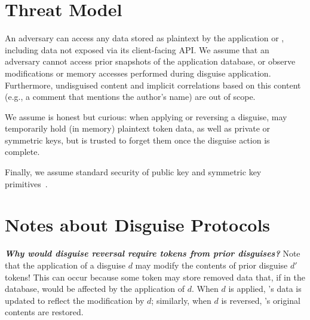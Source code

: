 
\section{Threat Model}
An adversary can access any data stored as plaintext by the application or \sys, including data not
exposed via its client-facing API. We assume that an adversary cannot access prior snapshots of the
application database, or observe modifications or memory accesses performed during disguise
application. Furthermore, undisguised content and implicit correlations based on this content (e.g.,
a comment that mentions the author’s name) are out of scope.

We assume \sys is honest but curious: when applying or reversing a disguise, \sys may temporarily
hold (in memory) plaintext token data, as well as private or symmetric keys, but is trusted to
forget them once the disguise action is complete.  

Finally, we assume standard security of public key and symmetric key primitives~.

\section{Notes about Disguise Protocols}
\textbf{\emph{Why would disguise reversal require tokens from prior disguises?}} 
Note that the application of a disguise $d$ may modify the contents of prior disguise $d'$ tokens!
This can occur because some token \tdata{} may store removed data that, if in the database, would be
affected by the application of $d$. When $d$ is applied, \tdata{}'s data is updated to reflect the
modification by $d$; similarly, when $d$ is reversed, \tdata{}'s original contents are restored.



